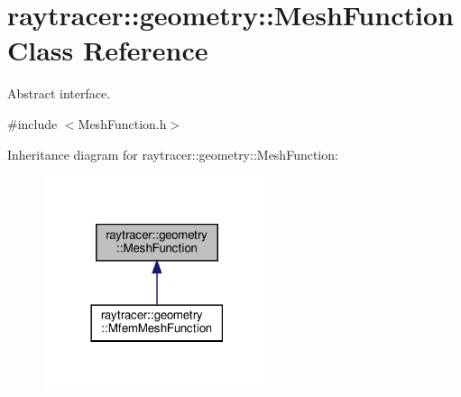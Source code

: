 \hypertarget{classraytracer_1_1geometry_1_1MeshFunction}{}\section{raytracer\+:\+:geometry\+:\+:Mesh\+Function Class Reference}
\label{classraytracer_1_1geometry_1_1MeshFunction}


Abstract interface.  




{\ttfamily \#include $<$Mesh\+Function.\+h$>$}



Inheritance diagram for raytracer\+:\+:geometry\+:\+:Mesh\+Function\+:\nopagebreak
\begin{figure}[H]
\begin{center}
\leavevmode
\includegraphics[width=189pt]{classraytracer_1_1geometry_1_1MeshFunction__inherit__graph}
\end{center}
\end{figure}
